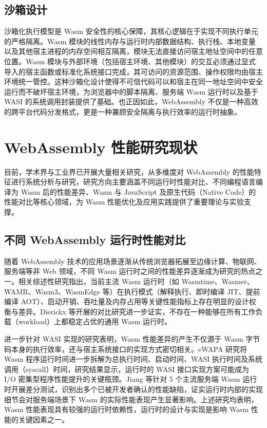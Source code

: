\subsection{沙箱设计}

沙箱化执行模型是 Wasm 安全性的核心保障，其核心逻辑在于实现不同执行单元的严格隔离。Wasm 模块的线性内存与运行时内部数据结构、执行栈、本地变量以及其他宿主进程的内存空间相互隔离，模块无法直接访问宿主地址空间中的任意位置。Wasm 模块与外部环境（包括宿主环境、其他模块）的交互必须通过显式导入的宿主函数或标准化系统接口完成，其可访问的资源范围、操作权限均由宿主环境统一管控。这种沙箱化设计使得不可信代码可以和宿主在同一地址空间中安全运行而不破坏宿主环境，为浏览器中的脚本隔离、服务端 Wasm 运行时以及基于 WASI 的系统调用封装提供了基础。也正因如此，WebAssembly 不仅是一种高效的跨平台代码分发格式，更是一种兼顾安全隔离与执行效率的运行时抽象。


\section{WebAssembly 性能研究现状}

目前，学术界与工业界已开展大量相关研究，从多维度对 WebAssembly 的性能特征进行系统分析与研究，研究方向主要涵盖不同运行时性能对比、不同编程语言编译为 Wasm 后的性能差异、Wasm 与 JavaScript 及原生代码（Native Code）的性能对比等核心领域，为 Wasm 性能优化及应用实践提供了重要理论与实验支撑。

\subsection{不同 WebAssembly 运行时性能对比}

随着 WebAssembly 技术的应用场景逐渐从传统浏览器拓展至边缘计算、物联网、服务端等非 Web 领域，不同 Wasm 运行时之间的性能差异逐渐成为研究的热点之一。相关综述性研究指出，当前主流 Wasm 运行时（如 Wasmtime、Wasmer、WAMR、Wasm3、WasmEdge 等）在执行模式（解释执行、即时编译 JIT、提前编译 AOT）、启动开销、吞吐量及内存占用等关键性能指标上存在明显的设计权衡与差异\cite{zhang2025research}。Dierickx 等开展的对比研究进一步证实，不存在一种能够在所有工作负载（workload）上都稳定占优的通用 Wasm 运行时\cite{dierickxcomparative}。

进一步针对 WASI 实现的研究表明，Wasm 性能差异的产生不仅源于 Wasm 字节码本身的执行效率，还与宿主系统接口的实现方式密切相关。eWAPA 研究将 Wasm 程序运行时间进一步拆解为总执行时间、启动时间、WASI 执行时间及系统调用（syscall）时间，研究结果显示，运行时的 WASI 接口实现方案可能成为 I/O 密集型程序性能提升的关键瓶颈\cite{mao2024ewapa}。Jiang 等针对 5 个主流服务端 Wasm 运行时开展差分测试，识别出多个已被开发者确认的性能缺陷，证实运行时内部的实现细节会对服务端场景下 Wasm 的实际性能表现产生显著影响\cite{jiang2023revealing}。上述研究均表明，Wasm 性能表现具有较强的运行时依赖性，运行时的设计与实现是影响 Wasm 性能的关键因素之一。

